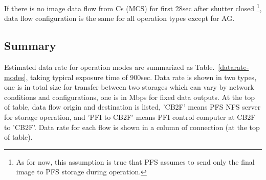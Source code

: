 \documentclass[a4paper,notitlepage]{article}
\begin{document}
If there is no image data flow from Cs (MCS) for first 28sec after shutter 
closed
\footnote{As for now, this assumption is true that PFS assumes to send only 
the final image to PFS storage during operation.}, 
data flow configuration is the same for all operation types except for AG. 

\subsection{Summary}

Estimated data rate for operation modes are summarized as 
Table.~\ref{datarate-modes}, taking typical exposure time of 900sec. 
Data rate is shown in two types, one is in total size for transfer between 
two storages which can vary by network conditions and configurations, 
one is in Mbps for fixed data outputs. 
At the top of table, data flow origin and destination is listed, 
'CB2F' means PFS NFS server for storage operation, 
and 'PFI to CB2F' means PFI control computer at CB2F to 'CB2F'.
Data rate for each flow is shown in a column of connection (at the top of 
table). 
\end{document}
